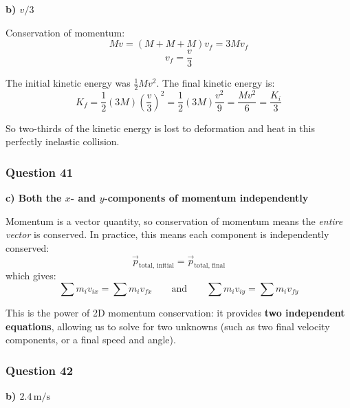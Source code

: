 \documentclass[12pt,letterpaper]{article}
\begin{document}
\begin{answerbox}
\textbf{b) $v/3$}
\end{answerbox}

\begin{explanationbox}
Conservation of momentum:
\[
Mv = (M + M + M)v_f = 3Mv_f
\]
\[
v_f = \frac{v}{3}
\]

The initial kinetic energy was $\frac{1}{2}Mv^2$. The final kinetic energy is:
\[
K_f = \frac{1}{2}(3M)\left(\frac{v}{3}\right)^2 = \frac{1}{2}(3M)\frac{v^2}{9} = \frac{Mv^2}{6} = \frac{K_i}{3}
\]

So two-thirds of the kinetic energy is lost to deformation and heat in this perfectly inelastic collision.
\end{explanationbox}

\subsubsection*{Question 41}

\begin{answerbox}
\textbf{c) Both the $x$- and $y$-components of momentum independently}
\end{answerbox}

\begin{explanationbox}
Momentum is a vector quantity, so conservation of momentum means the \emph{entire vector} is conserved. In practice, this means each component is independently conserved:
\[
\vec{p}_{\text{total, initial}} = \vec{p}_{\text{total, final}}
\]
which gives:
\[
\sum m_i v_{ix} = \sum m_i v_{fx} \qquad \text{and} \qquad \sum m_i v_{iy} = \sum m_i v_{fy}
\]

This is the power of 2D momentum conservation: it provides \textbf{two independent equations}, allowing us to solve for two unknowns (such as two final velocity components, or a final speed and angle).
\end{explanationbox}

\subsubsection*{Question 42}

\begin{answerbox}
\textbf{b) $2.4\,\text{m/s}$}
\end{answerbox}
\end{document}

